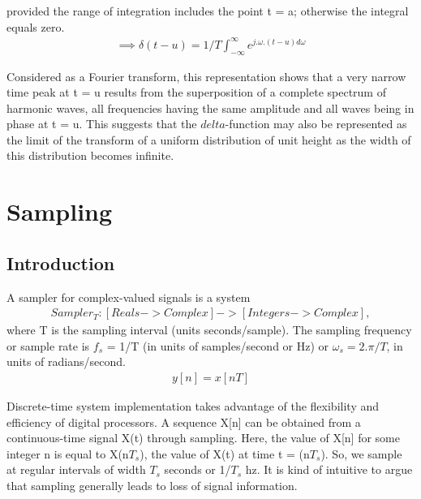 \documentclass{article}
\begin{document}
provided the range of integration includes the point t = a; otherwise the integral equals zero.
\begin{equation}
\begin{aligned}
    \implies \delta(t-u) = 1/T \int_{-\infty}^{\infty} e^{j.\omega.(t-u) d\omega}
\end{aligned}
\end{equation}

Considered as a Fourier transform, this representation shows that a very narrow time peak at t = u results from the superposition of a complete spectrum of harmonic waves, all frequencies having the same amplitude and all waves being in phase at t = u. This suggests that the $delta$-function may also be represented as the limit of the transform of a uniform distribution of unit height as the width of this distribution becomes infinite.

\section{Sampling}


\subsection{Introduction}
\cite{b6} A sampler for complex-valued signals is a system 
\begin{equation}
\begin{aligned}
    Sampler_T:[Reals->Complex] -> [Integers -> Complex],
\end{aligned}
\end{equation}
where T is the sampling interval (units seconds/sample). The sampling frequency or sample rate is $f_s$ = 1/T (in units of samples/second or Hz) or $\omega_s = 2.\pi / T$, in units of radians/second. 
\begin{equation}
\begin{aligned}
    y[n] = x[nT]
\end{aligned}
\end{equation}

\cite{b5} Discrete-time system implementation  takes advantage of the flexibility and efficiency of digital processors. A sequence X[n] can be obtained from a
continuous-time signal X(t) through sampling. Here, the value of X[n] for some integer n is equal to X(n$T_s$), the value of X(t) at time t = (n$T_s$). So,
we sample at regular intervals of width $T_s$ seconds or 1/$T_s$ hz.  It is kind of intuitive to argue that sampling generally leads to loss of signal information. 
\end{document}
